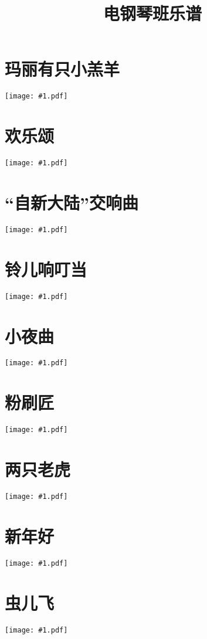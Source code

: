 \documentclass[a4paper,12pt,fontset=none]{ctexart}
\title{\bfseries 电钢琴班乐谱}
\author{}
\date{}
\newcommand{\includescore}[1]{\begin{center}\texttt{[image: \#1.pdf]}\end{center}}
\begin{document}
\pagestyle{plain}

\maketitle

\thispagestyle{plain}

\section{玛丽有只小羔羊}
\includescore{mary-had-a-little-lamb}

\section{欢乐颂}
\includescore{ode-to-joy}

\section{“自新大陆”交响曲}
\includescore{from-the-new-world}

\section{铃儿响叮当}
\includescore{jingle-bells}

\section{小夜曲}
\includescore{serenade}

\section{粉刷匠}
\includescore{painter}

\section{两只老虎}
\includescore{two-tigers}

\section{新年好}
\includescore{happy-new-year}

\section{虫儿飞}
\includescore{bug-fly}
\end{document}
